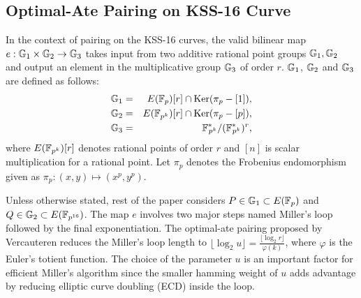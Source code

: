 \subsection{Optimal-Ate Pairing on KSS-16 Curve}
In the context of pairing on the KSS-16 curves, the valid bilinear map $e:{\mathbb{G}}_{1} \times {\mathbb{G}}_{2} \rightarrow {\mathbb{G}}_{3}$ takes input from two additive rational point groups ${\mathbb{G}}_{1}, {\mathbb{G}}_{2}$ 
and output an element in the multiplicative group ${\mathbb{G}}_{3}$ of order $r$. 
${\mathbb{G}}_{1}$, ${\mathbb{G}}_{2}$ and ${\mathbb{G}}_{3}$ are defined as follows:
\begin{eqnarray}\label{eq:g1}
{\mathbb{G}}_{1} & = &  E(\mathbb{F}_p) [r] \cap \text{Ker}(\pi_p - [1]), \nonumber \\
{\mathbb{G}}_{2} & = &  E({\mathbb{F}}_{p^{k}}) [r] \cap \text{Ker}(\pi_p - [p]), \nonumber \\
{\mathbb{G}}_{3} & = & {{\mathbb{F}}^{\ast}}_{\!\!\!p^{k}}/({{\mathbb{F}}^{\ast}}_{\!\!\!p^{k}})^r, \nonumber
\end{eqnarray}
where $E({\mathbb{F}}_{p^{k}})[r]$ denotes rational points of order $r$ and $[n]$ is scalar multiplication for a rational point. 
Let $\pi_p$ denotes the Frobenius endomorphism given as $\pi_p: (x,y) \mapsto (x^p,y^p)$.

Unless otherwise stated, rest of the paper considers $P \in {\mathbb{G}}_{1} \subset E(\mathbb{F}_p)$ and  $Q \in {\mathbb{G}}_{2} \subset  E(\mathbb{F}_{p^{16}})$. The map $e$ involves two major steps named Miller's loop followed by the final exponentiation.
The optimal-ate pairing \cite{DBLP:journals/tit/Vercauteren10} proposed by Vercauteren reduces the Miller's loop length  to $\lfloor \log_2 u \rfloor = \frac{\lfloor \log_2 r \rfloor }{\varphi(k)} $, where $\varphi$ is the Euler's totient function.
The choice of the parameter $u$ is an important factor for efficient Miller's algorithm since the smaller hamming weight of $u$ adds advantage by reducing elliptic curve doubling (ECD) inside the loop.

